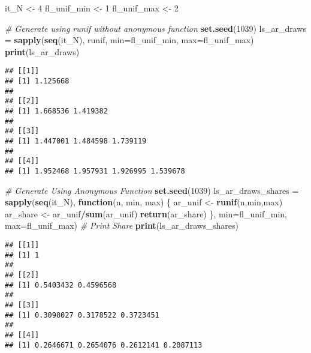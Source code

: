 \documentclass[
]{book}
\newenvironment{Shaded}{\begin{snugshade}}{\end{snugshade}}
\newcommand{\CommentTok}[1]{\textcolor[rgb]{0.56,0.35,0.01}{\textit{#1}}}
\newcommand{\ControlFlowTok}[1]{\textcolor[rgb]{0.13,0.29,0.53}{\textbf{#1}}}
\newcommand{\DataTypeTok}[1]{\textcolor[rgb]{0.13,0.29,0.53}{#1}}
\newcommand{\DecValTok}[1]{\textcolor[rgb]{0.00,0.00,0.81}{#1}}
\newcommand{\KeywordTok}[1]{\textcolor[rgb]{0.13,0.29,0.53}{\textbf{#1}}}
\newcommand{\NormalTok}[1]{#1}
\newcommand{\OperatorTok}[1]{\textcolor[rgb]{0.81,0.36,0.00}{\textbf{#1}}}
\newcommand{\StringTok}[1]{\textcolor[rgb]{0.31,0.60,0.02}{#1}}
\begin{document}
\begin{Shaded}
\begin{Highlighting}[]
\NormalTok{it_N <-}\StringTok{ }\DecValTok{4}
\NormalTok{fl_unif_min <-}\StringTok{ }\DecValTok{1}
\NormalTok{fl_unif_max <-}\StringTok{ }\DecValTok{2}

\CommentTok{# Generate using runif without anonymous function}
\KeywordTok{set.seed}\NormalTok{(}\DecValTok{1039}\NormalTok{)}
\NormalTok{ls_ar_draws =}\StringTok{ }\KeywordTok{sapply}\NormalTok{(}\KeywordTok{seq}\NormalTok{(it_N),}
\NormalTok{                     runif,}
                     \DataTypeTok{min=}\NormalTok{fl_unif_min, }\DataTypeTok{max=}\NormalTok{fl_unif_max)}
\KeywordTok{print}\NormalTok{(ls_ar_draws)}
\end{Highlighting}
\end{Shaded}

\begin{verbatim}
## [[1]]
## [1] 1.125668
## 
## [[2]]
## [1] 1.668536 1.419382
## 
## [[3]]
## [1] 1.447001 1.484598 1.739119
## 
## [[4]]
## [1] 1.952468 1.957931 1.926995 1.539678
\end{verbatim}

\begin{Shaded}
\begin{Highlighting}[]
\CommentTok{# Generate Using Anonymous Function}
\KeywordTok{set.seed}\NormalTok{(}\DecValTok{1039}\NormalTok{)}
\NormalTok{ls_ar_draws_shares =}\StringTok{ }\KeywordTok{sapply}\NormalTok{(}\KeywordTok{seq}\NormalTok{(it_N),}
                            \ControlFlowTok{function}\NormalTok{(n, min, max) \{}
\NormalTok{                              ar_unif <-}\StringTok{ }\KeywordTok{runif}\NormalTok{(n,min,max)}
\NormalTok{                              ar_share <-}\StringTok{ }\NormalTok{ar_unif}\OperatorTok{/}\KeywordTok{sum}\NormalTok{(ar_unif)}
                              \KeywordTok{return}\NormalTok{(ar_share)}
\NormalTok{                            \},}
                            \DataTypeTok{min=}\NormalTok{fl_unif_min, }\DataTypeTok{max=}\NormalTok{fl_unif_max)}
\CommentTok{# Print Share}
\KeywordTok{print}\NormalTok{(ls_ar_draws_shares)}
\end{Highlighting}
\end{Shaded}

\begin{verbatim}
## [[1]]
## [1] 1
## 
## [[2]]
## [1] 0.5403432 0.4596568
## 
## [[3]]
## [1] 0.3098027 0.3178522 0.3723451
## 
## [[4]]
## [1] 0.2646671 0.2654076 0.2612141 0.2087113
\end{verbatim}
\end{document}
